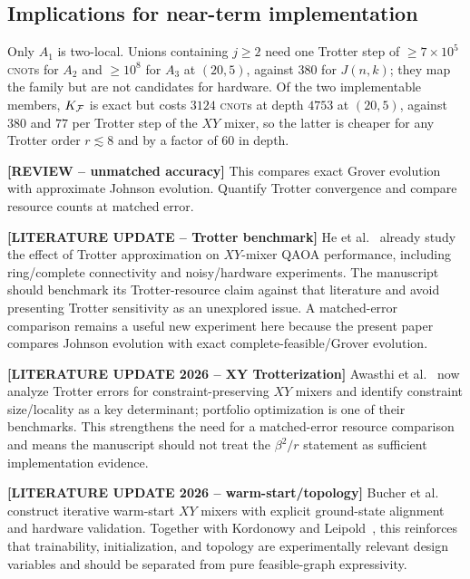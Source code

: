 \subsection{\label{sec:nisq}Implications for near-term implementation}
Only $A_1$ is two-local. Unions containing $j\ge2$ need one Trotter step
of $\ge7\times10^{5}$ \textsc{cnot}s for $A_2$ and $\ge10^{8}$ for $A_3$
at $(20,5)$, against $380$ for $J(n,k)$; they map the family but are not
candidates for hardware. Of the two implementable members, $K_{\mathcal{F}}$ is
exact but costs $3124$ \textsc{cnot}s at depth $4753$ at $(20,5)$,
against $380$ and $77$ per Trotter step of the $XY$ mixer, so the latter
is cheaper for any Trotter order $r\lesssim8$ and by a factor of $60$ in
depth.

{\color{red}\textbf{[REVIEW -- unmatched accuracy]} This compares exact Grover evolution with approximate Johnson evolution. Quantify Trotter convergence and compare resource counts at matched error.}

{\color{red}\textbf{[LITERATURE UPDATE -- Trotter benchmark]} He et al.~\cite{He2023} already study the effect of Trotter approximation on $XY$-mixer QAOA performance, including ring/complete connectivity and noisy/hardware experiments. The manuscript should benchmark its Trotter-resource claim against that literature and avoid presenting Trotter sensitivity as an unexplored issue. A matched-error comparison remains a useful new experiment here because the present paper compares Johnson evolution with exact complete-feasible/Grover evolution.}

{\color{red}\textbf{[LITERATURE UPDATE 2026 -- XY Trotterization]} Awasthi et al.~\cite{Awasthi2026Trotter} now analyze Trotter errors for constraint-preserving $XY$ mixers and identify constraint size/locality as a key determinant; portfolio optimization is one of their benchmarks. This strengthens the need for a matched-error resource comparison and means the manuscript should not treat the $\beta^2/r$ statement as sufficient implementation evidence.}

{\color{red}\textbf{[LITERATURE UPDATE 2026 -- warm-start/topology]} Bucher et al.~\cite{Bucher2026WarmStart} construct iterative warm-start $XY$ mixers with explicit ground-state alignment and hardware validation. Together with Kordonowy and Leipold~\cite{Kordonowy2026}, this reinforces that trainability, initialization, and topology are experimentally relevant design variables and should be separated from pure feasible-graph expressivity.}

